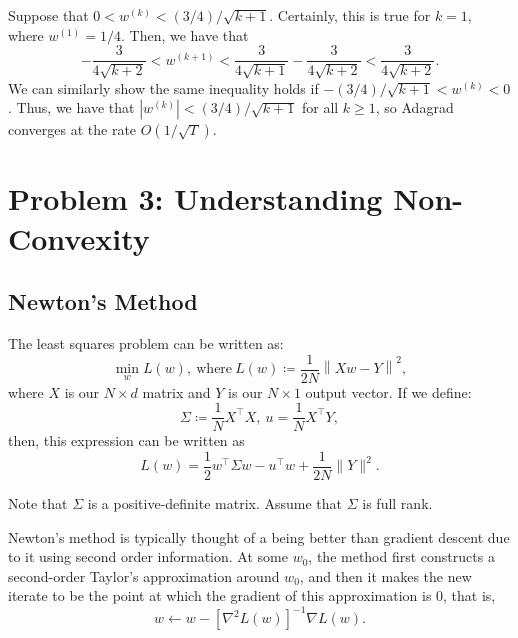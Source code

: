 \documentclass[letterpaper,11pt]{article}
\begin{document}
\begin{enumerate}
  Suppose that $0 < w^{(k)} < (3/4)/\sqrt{k + 1}$. Certainly, this is true for
  $k = 1$, where $w^{(1)} = 1/4$. Then, we have that
  \begin{equation}
    -\frac{3}{4\sqrt{k + 2}} < w^{(k + 1)} < \frac{3}{4\sqrt{k+1}} - \frac{3}{4\sqrt{k + 2}} < \frac{3}{4\sqrt{k + 2}}.
  \end{equation}
  We can similarly show the same inequality holds if
  $-(3/4)/\sqrt{k + 1} < w^{(k)} < 0$. Thus, we have that
  $\left\lvert w^{(k)} \right\rvert < (3/4)/\sqrt{k + 1}$ for all $k \geq 1$, so
  Adagrad converges at the rate $O\left(1/\sqrt{T}\right)$.  
\end{enumerate}

\section*{Problem 3: Understanding Non-Convexity}

\subsection*{Newton's Method}

The least squares problem can be written as:
\begin{equation}
  \min_{w}L(w),~\text{where}~L(w) \coloneqq \frac{1}{2N}\left\lVert Xw - Y\right\rVert^2,
\end{equation}
where $X$ is our $N \times d$ matrix and $Y$ is our $N \times 1$ output vector. If we define:
\begin{equation}
  \Sigma \coloneqq \frac{1}{N}X^\intercal X,~u = \frac{1}{N}X^\intercal Y,
\end{equation}
then, this expression can be written as
\begin{equation}
  L(w) = \frac{1}{2}w^\intercal\Sigma w - u^\intercal w + \frac{1}{2N}\lVert Y \rVert^2.
\end{equation}

Note that $\Sigma$ is a positive-definite matrix. Assume that $\Sigma$ is full
rank.

Newton's method is typically thought of a being better than gradient descent due
to it using second order information. At some $w_0$, the method first constructs
a second-order Taylor's approximation around $w_0$, and then it makes the new
iterate to be the point at which the gradient of this approximation is $0$, that
is,
\begin{equation}
  w \leftarrow w - \left[ \nabla^2 L(w) \right]^{-1} \nabla L(w).
  \label{eqn:newton_update}
\end{equation}
\end{document}
